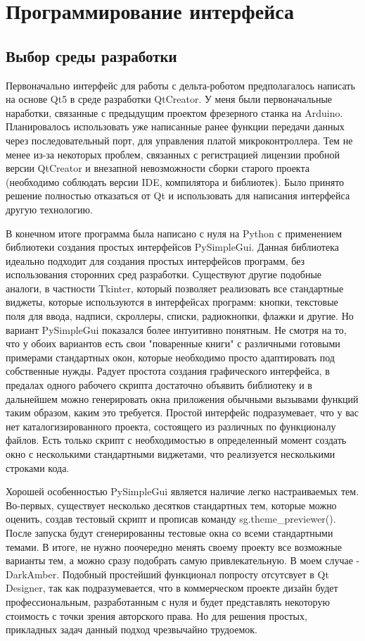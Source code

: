 \section{Программирование интерфейса}
\subsection{Выбор среды разработки}

Первоначально интерфейс для работы с дельта-роботом предполагалось написать на основе Qt5 в среде разработки QtCreator. У меня были первоначальные наработки, связанные с предыдущим проектом фрезерного станка на Arduino. Планировалось использовать уже написанные ранее функции передачи данных через последовательный порт, для управления платой микроконтроллера. Тем не менее из-за некоторых проблем, связанных с регистрацией лицензии пробной версии QtCreator и внезапной невозможности сборки старого проекта (необходимо соблюдать версии IDE, компилятора и библиотек). Было принято решение полностью отказаться от Qt и использовать для написания интерфейса другую технологию.

В конечном итоге программа была написано с нуля на Python с применением библиотеки создания простых интерфейсов PySimpleGui. Данная библиотека идеально подходит для создания простых интерфейсов программ, без использования сторонних сред разработки. Существуют другие подобные аналоги, в частности Tkinter, который позволяет реализовать все стандартные виджеты, которые используются в интерфейсах программ:  кнопки, текстовые поля для ввода, надписи, скроллеры, списки, радиокнопки, флажки и другие. Но вариант PySimpleGui показался более интуитивно понятным. Не смотря на то, что у обоих вариантов есть свои "поваренные книги" с различными готовыми примерами стандартных окон, которые необходимо просто адаптировать под собственные нужды. Радует простота создания графического интерфейса, в предалах одного рабочего скрипта достаточно объявить библиотеку и в дальнейшем можно генерировать окна приложения обычными вызывами функций таким образом, каким это требуется. Простой интерфейс подразумевает, что у вас нет каталогизированного проекта, состоящего из различных по функционалу файлов. Есть только скрипт с необходимостью в определенный момент создать окно с несколькими стандартными виджетами, что реализуется несколькими строками кода.  

Хорошей особенностью PySimpleGui является наличие легко настраиваемых тем. Во-первых, существует несколько десятков стандартных тем, которые можно оценить, создав тестовый скрипт и прописав команду sg.theme\_previewer(). После запуска будут сгенерированны тестовые окна со всеми стандартными темами. В итоге, не нужно поочередно менять своему проекту все возможные варианты тем, а можно сразу подобрать самую привлекательную. В моем случае - DarkAmber. Подобный простейший функционал попросту отсутсвует в Qt Designer, так как подразумевается, что в коммерческом проекте дизайн будет профессиональным, разработанным с нуля и будет представлять некоторую стоимость с точки зрения авторского права. Но для решения простых, прикладных задач данный подход чрезвычайно трудоемок.

